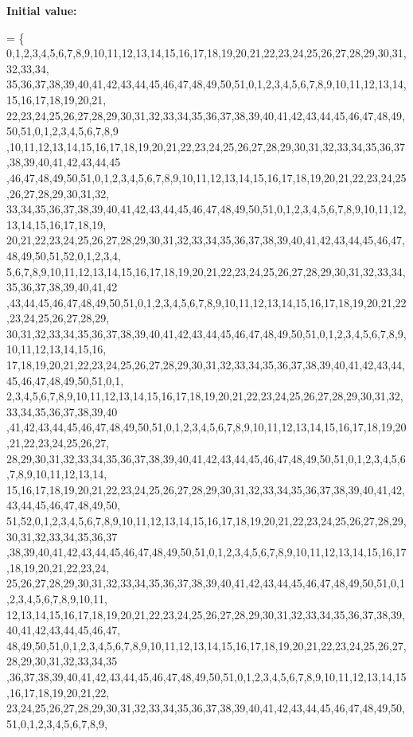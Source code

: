 {\bfseries Initial value\+:}
\begin{DoxyCode}
= \{
            0,1,2,3,4,5,6,7,8,9,10,11,12,13,14,15,16,17,18,19,20,21,22,23,24,25,26,27,28,29,30,31,32,33,34,
      35,36,37,38,39,40,41,42,43,44,45,46,47,48,49,50,51,0,1,2,3,4,5,6,7,8,9,10,11,12,13,14,15,16,17,18,19,20,21,
      22,23,24,25,26,27,28,29,30,31,32,33,34,35,36,37,38,39,40,41,42,43,44,45,46,47,48,49,50,51,0,1,2,3,4,5,6,7,8,9
      ,10,11,12,13,14,15,16,17,18,19,20,21,22,23,24,25,26,27,28,29,30,31,32,33,34,35,36,37,38,39,40,41,42,43,44,45
      ,46,47,48,49,50,51,0,1,2,3,4,5,6,7,8,9,10,11,12,13,14,15,16,17,18,19,20,21,22,23,24,25,26,27,28,29,30,31,32,
      33,34,35,36,37,38,39,40,41,42,43,44,45,46,47,48,49,50,51,0,1,2,3,4,5,6,7,8,9,10,11,12,13,14,15,16,17,18,19,
      20,21,22,23,24,25,26,27,28,29,30,31,32,33,34,35,36,37,38,39,40,41,42,43,44,45,46,47,48,49,50,51,52,0,1,2,3,4,
      5,6,7,8,9,10,11,12,13,14,15,16,17,18,19,20,21,22,23,24,25,26,27,28,29,30,31,32,33,34,35,36,37,38,39,40,41,42
      ,43,44,45,46,47,48,49,50,51,0,1,2,3,4,5,6,7,8,9,10,11,12,13,14,15,16,17,18,19,20,21,22,23,24,25,26,27,28,29,
      30,31,32,33,34,35,36,37,38,39,40,41,42,43,44,45,46,47,48,49,50,51,0,1,2,3,4,5,6,7,8,9,10,11,12,13,14,15,16,
      17,18,19,20,21,22,23,24,25,26,27,28,29,30,31,32,33,34,35,36,37,38,39,40,41,42,43,44,45,46,47,48,49,50,51,0,1,
      2,3,4,5,6,7,8,9,10,11,12,13,14,15,16,17,18,19,20,21,22,23,24,25,26,27,28,29,30,31,32,33,34,35,36,37,38,39,40
      ,41,42,43,44,45,46,47,48,49,50,51,0,1,2,3,4,5,6,7,8,9,10,11,12,13,14,15,16,17,18,19,20,21,22,23,24,25,26,27,
      28,29,30,31,32,33,34,35,36,37,38,39,40,41,42,43,44,45,46,47,48,49,50,51,0,1,2,3,4,5,6,7,8,9,10,11,12,13,14,
      15,16,17,18,19,20,21,22,23,24,25,26,27,28,29,30,31,32,33,34,35,36,37,38,39,40,41,42,43,44,45,46,47,48,49,50,
      51,52,0,1,2,3,4,5,6,7,8,9,10,11,12,13,14,15,16,17,18,19,20,21,22,23,24,25,26,27,28,29,30,31,32,33,34,35,36,37
      ,38,39,40,41,42,43,44,45,46,47,48,49,50,51,0,1,2,3,4,5,6,7,8,9,10,11,12,13,14,15,16,17,18,19,20,21,22,23,24,
      25,26,27,28,29,30,31,32,33,34,35,36,37,38,39,40,41,42,43,44,45,46,47,48,49,50,51,0,1,2,3,4,5,6,7,8,9,10,11,
      12,13,14,15,16,17,18,19,20,21,22,23,24,25,26,27,28,29,30,31,32,33,34,35,36,37,38,39,40,41,42,43,44,45,46,47,
      48,49,50,51,0,1,2,3,4,5,6,7,8,9,10,11,12,13,14,15,16,17,18,19,20,21,22,23,24,25,26,27,28,29,30,31,32,33,34,35
      ,36,37,38,39,40,41,42,43,44,45,46,47,48,49,50,51,0,1,2,3,4,5,6,7,8,9,10,11,12,13,14,15,16,17,18,19,20,21,22,
      23,24,25,26,27,28,29,30,31,32,33,34,35,36,37,38,39,40,41,42,43,44,45,46,47,48,49,50,51,0,1,2,3,4,5,6,7,8,9,

\end{DoxyCode}
